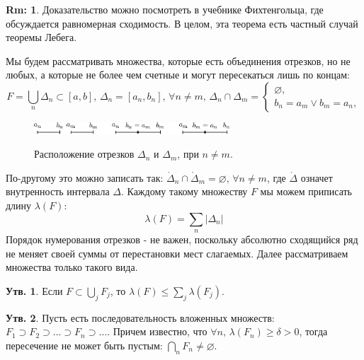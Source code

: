 \documentclass[12pt]{article}
\newcommand{\VN}{\varnothing}
\theoremstyle{definition}
\newtheorem{rem}{Rm:}
\newtheorem{prop}{Утв.}
\begin{document}
\begin{rem}
	Доказательство можно посмотреть в учебнике Фихтенгольца, где обсуждается равномерная сходимость. В целом, эта теорема есть частный случай теоремы Лебега.
\end{rem}
Мы будем рассматривать множества, которые есть объединения отрезков, но не любых, а которые не более чем счетные и могут пересекаться лишь по концам:
$$
	F = \bigcup\limits_{n} \Delta_n \subset [a,b], \, \Delta_n = [a_n, b_n], \, \forall n \neq m, \, \Delta_n \cap \Delta_m = 
	\begin{cases}
		\VN, \\
		b_n = a_m \vee b_m = a_n,
	\end{cases}
$$
\begin{figure}[H]
	\centering
	\includegraphics[width=0.65\textwidth]{MA3L12_1.eps}
	\label{MA3L12_1}
	\caption{Расположение отрезков $\Delta_n$ и $\Delta_m$, при $n \neq m$.}
	\label{fig:Покрытие	}
\end{figure}
По-другому это можно записать так: $\mathring{\Delta}_n \cap \mathring{\Delta}_m = \VN, \, \forall n \neq m$, где $\mathring{\Delta}$ означет внутренность интервала $\Delta$. Каждому такому множеству $F$ мы можем приписать длину $\lambda(F)$: 
$$
	\lambda(F) = \sum\limits_{n}|\Delta_n|
$$ 
Порядок нумерования отрезков - не важен, поскольку абсолютно сходящийся ряд не меняет своей суммы от перестановки мест слагаемых. Далее рассматриваем множества только такого вида.
\begin{prop}
	Если $F \subset \displaystyle \bigcup\limits_j F_j$, то $\lambda(F) \leq \displaystyle\sum\limits_{j} \lambda(F_j)$.
\end{prop}
\begin{prop}
	Пусть есть последовательность вложенных множеств: $F_1 \supset F_2 \supset \dotsc \supset F_n \supset \dotsc $. Причем известно, что $\forall n, \, \lambda(F_n) \geq \delta > 0$, тогда пересечение не может быть пустым: $\displaystyle \bigcap\limits_{n} F_n \neq \VN$.
\end{prop}
\end{document}
